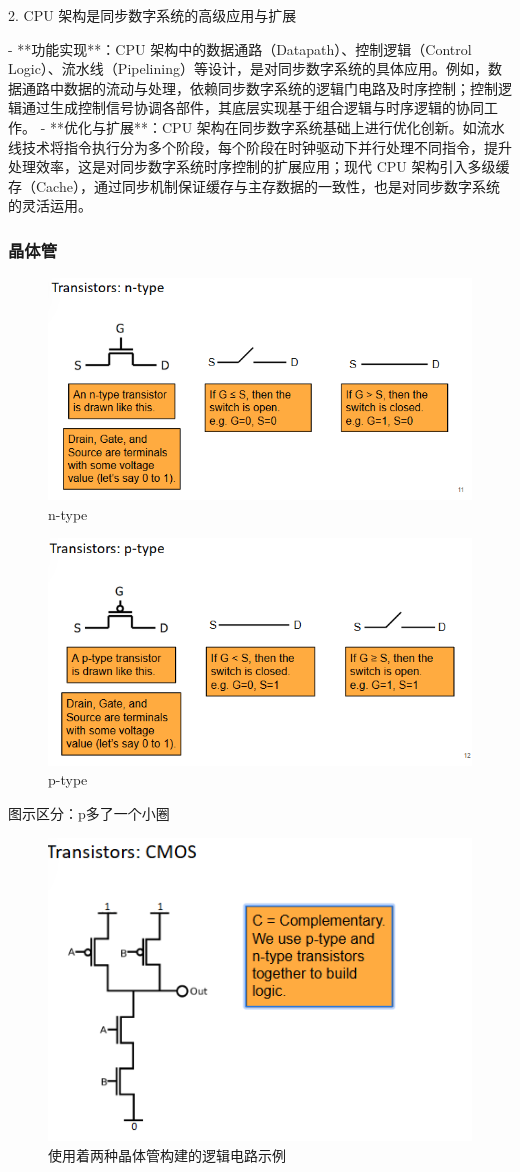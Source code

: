 \documentclass{ctexart}
\begin{document}
 2. CPU 架构是同步数字系统的高级应用与扩展  \par
- **功能实现**：CPU 架构中的数据通路（Datapath）、控制逻辑（Control Logic）、流水线（Pipelining）等设计，是对同步数字系统的具体应用。例如，数据通路中数据的流动与处理，依赖同步数字系统的逻辑门电路及时序控制；控制逻辑通过生成控制信号协调各部件，其底层实现基于组合逻辑与时序逻辑的协同工作。  
- **优化与扩展**：CPU 架构在同步数字系统基础上进行优化创新。如流水线技术将指令执行分为多个阶段，每个阶段在时钟驱动下并行处理不同指令，提升处理效率，这是对同步数字系统时序控制的扩展应用；现代 CPU 架构引入多级缓存（Cache），通过同步机制保证缓存与主存数据的一致性，也是对同步数字系统的灵活运用。  \par
\subsubsection{晶体管}
\begin{figure}
    \centering
    \includegraphics[width=0.5\linewidth]{n-type.png}
    \caption{n-type}
    \label{fig:enter-label}
\end{figure}
\begin{figure}
    \centering
    \includegraphics[width=0.5\linewidth]{p-type.png}
    \caption{p-type}
    \label{fig:enter-label}
\end{figure}
图示区分：p多了一个小圈
\begin{figure}
    \centering
    \includegraphics[width=0.5\linewidth]{使用着两种晶体管构建的逻辑电路示例.png}
    \caption{使用着两种晶体管构建的逻辑电路示例}
    \label{fig:enter-label}
\end{figure}
\end{document}

